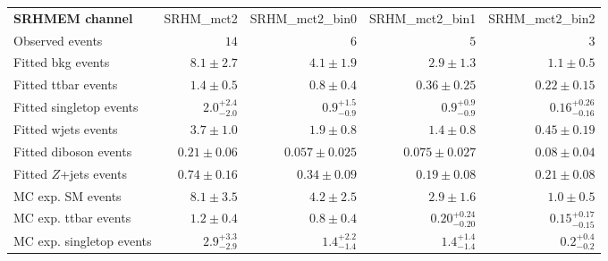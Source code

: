 

\begin{table}
\begin{center}
\setlength{\tabcolsep}{0.0pc}
{\small
\begin{tabular*}{\textwidth}{@{\extracolsep{\fill}}lrrrr}
\noalign{\smallskip}\hline\noalign{\smallskip}
{\textbf{ SRHMEM channel}}           & SRHM\_mct2            & SRHM\_mct2\_bin0            & SRHM\_mct2\_bin1            & SRHM\_mct2\_bin2              \\[-0.05cm]
\noalign{\smallskip}\hline\noalign{\smallskip}
Observed events          & $14$              & $6$              & $5$              & $3$                    \\
\noalign{\smallskip}\hline\noalign{\smallskip}
Fitted bkg events         & $8.1 \pm 2.7$          & $4.1 \pm 1.9$          & $2.9 \pm 1.3$          & $1.1 \pm 0.5$              \\
\noalign{\smallskip}\hline\noalign{\smallskip}
        Fitted ttbar events         & $1.4 \pm 0.5$          & $0.8 \pm 0.4$          & $0.36 \pm 0.25$          & $0.22 \pm 0.15$              \\
        Fitted singletop events         & $2.0_{-2.0}^{+2.4}$          & $0.9_{-0.9}^{+1.5}$          & $0.9_{-0.9}^{+0.9}$          & $0.16_{-0.16}^{+0.26}$              \\
        Fitted wjets events         & $3.7 \pm 1.0$          & $1.9 \pm 0.8$          & $1.4 \pm 0.8$          & $0.45 \pm 0.19$              \\
        Fitted diboson events         & $0.21 \pm 0.06$          & $0.057 \pm 0.025$          & $0.075 \pm 0.027$          & $0.08 \pm 0.04$              \\
        Fitted $Z$+jets events         & $0.74 \pm 0.16$          & $0.34 \pm 0.09$          & $0.19 \pm 0.08$          & $0.21 \pm 0.08$              \\
 \noalign{\smallskip}\hline\noalign{\smallskip}
MC exp. SM events              & $8.1 \pm 3.5$          & $4.2 \pm 2.5$          & $2.9 \pm 1.6$          & $1.0 \pm 0.5$              \\
\noalign{\smallskip}\hline\noalign{\smallskip}
        MC exp. ttbar events         & $1.2 \pm 0.4$          & $0.8 \pm 0.4$          & $0.20_{-0.20}^{+0.24}$          & $0.15_{-0.15}^{+0.17}$              \\
        MC exp. singletop events         & $2.9_{-2.9}^{+3.3}$          & $1.4_{-1.4}^{+2.2}$          & $1.4_{-1.4}^{+1.4}$          & $0.2_{-0.2}^{+0.4}$              \\

\end{tabular*}}
\end{center}
\end{table}
